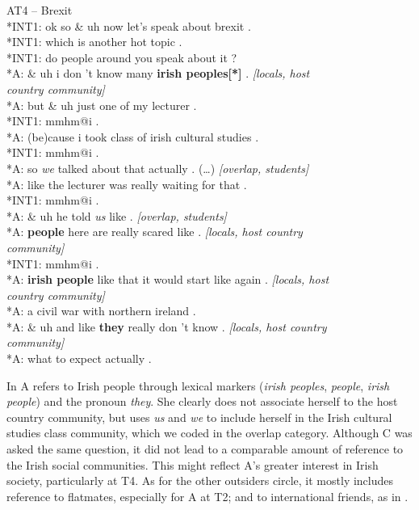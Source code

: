 \documentclass[output=paper]{langscibook}
\begin{document}
\ea%
    \label{ex:13}
    AT4 – Brexit\medskip\\
*INT1:  \tab ok so \& uh now let's speak about brexit .\\
*INT1: \tab which is another hot topic .\\
*INT1: \tab do people around you speak about it ?\\
*A: \tab \& uh i don 't know many \textbf{irish peoples[*]} . \textit{[locals, host \\ \tab country community]}\\
*A: \tab but \& uh just one of my lecturer .\\
*INT1: \tab mmhm@i .\\
*A: \tab (be)cause i took class of irish cultural studies .\\
*INT1: \tab mmhm@i .\\
*A: \tab so \textit{we} talked about that actually . (…) \textit{[overlap, students]}\\
*A: \tab like the lecturer was really waiting for that .\\
*INT1: \tab  mmhm@i .\\
*A: \tab \& uh he told \textit{us} like . \textit{[overlap, students]}\\
*A: \tab \textbf{people} here are really scared like . \textit{[locals, host country \\ \tab community]}\\
*INT1: \tab  mmhm@i .\\
*A: \tab \textbf{irish people} like that it would start like again . \textit{[locals, host\\ \tab country community]}\\
*A: \tab a civil war with northern ireland .\\
*A: \tab \& uh and like \textbf{they} really don 't know . \textit{[locals, host country \\ \tab community]}\\
*A: \tab what to expect actually .
\z

In  A refers to Irish people through lexical markers (\textit{irish peoples}, \textit{people}, \textit{irish people}) and the pronoun \textit{they}. She clearly does not associate herself to the host country community, but uses \textit{us} and \textit{we} to include herself in the Irish cultural studies class community, which we coded in the overlap category. Although C was asked the same question, it did not lead to a comparable amount of reference to the Irish social communities. This might reflect A’s greater interest in Irish society, particularly at T4. As for the other outsiders circle, it mostly includes reference to flatmates, especially for A at T2; and to international friends, as in .
\end{document}
